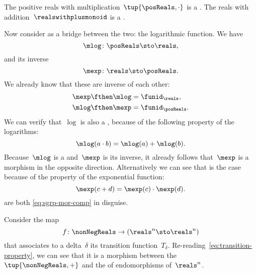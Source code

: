 \begin{example}
    The positive reals with multiplication~$\tup{\posReals, \cdot}$ is a .
    The reals with addition~$\realswithplusmonoid$ is a .

    Now consider as a bridge between the two: the logarithmic function.
    We have
    \begin{equation}
        \label{eq:log}
        \mlog \colon \posReals \sto \reals,
    \end{equation}
    and its inverse
    \begin{equation}
        \label{eq:exp}
        \mexp \colon \reals \sto \posReals.
    \end{equation}
    We already know that these are inverse of each other:
    \begin{equation}
        \label{eq:exp-log-are-inverses}
        \begin{aligned}
            \mexp \fthen \mlog & = \funid_{\reals}, \\
            \mlog \fthen \mexp & = \funid_{\posReals}.
        \end{aligned}
    \end{equation}
    We can verify that~$\log$ is also a , because of the following property of the logarithms:
    \begin{equation}
        \label{eq:log-property}
        \mlog(a \cdot b) = \mlog(a) + \mlog(b).
    \end{equation}
    Because~$\mlog$ is a  and~$\mexp$ is its inverse, it already follows that~$\mexp$ is a morphism in the opposite direction.
    Alternatively we can see that is the case because of the property of the exponential function:
    \begin{equation}
        \label{eq:exp-property}
        \mexp(c + d) = \mexp(c) \cdot \mexp(d).
    \end{equation}
     are both \cref{eq:sgrp-mor-comp} in disguise.
\end{example}

\begin{example}
    Consider the map
    \begin{equation}
        f\colon \nonNegReals \to (\reals^n \sto \reals^n)
    \end{equation}
    that associates to a delta~$\delta$ its transition function~$T_\delta$.
    Re-reading~\cref{eq:transition-property}, we can see that it is a morphism between the ~$\tup{\nonNegReals,+}$ and the  of endomorphisms of~$\reals^n$.
\end{example}

